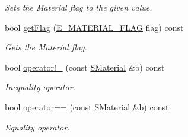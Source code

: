 \begin{DoxyCompactItemize}
\begin{DoxyCompactList}\small\item\em Sets the Material flag to the given value. \end{DoxyCompactList}\item 
bool \hyperlink{classirr_1_1video_1_1SMaterial_a3811e59a69983b4a7fce2d8e7aaf91f1}{get\+Flag} (\hyperlink{namespaceirr_1_1video_a8a3bc00ae8137535b9fbc5f40add70d3}{E\+\_\+\+M\+A\+T\+E\+R\+I\+A\+L\+\_\+\+F\+L\+AG} flag) const
\begin{DoxyCompactList}\small\item\em Gets the Material flag. \end{DoxyCompactList}\item 
bool \hyperlink{classirr_1_1video_1_1SMaterial_aeb4cd5880d7fbf330dc4d5cca0177407}{operator!=} (const \hyperlink{classirr_1_1video_1_1SMaterial}{S\+Material} \&b) const
\begin{DoxyCompactList}\small\item\em Inequality operator. \end{DoxyCompactList}\item 
bool \hyperlink{classirr_1_1video_1_1SMaterial_a32066f6f8ee564be1cabc73de1d0cb6a}{operator==} (const \hyperlink{classirr_1_1video_1_1SMaterial}{S\+Material} \&b) const
\begin{DoxyCompactList}\small\item\em Equality operator. \end{DoxyCompactList}\end{DoxyCompactItemize}
